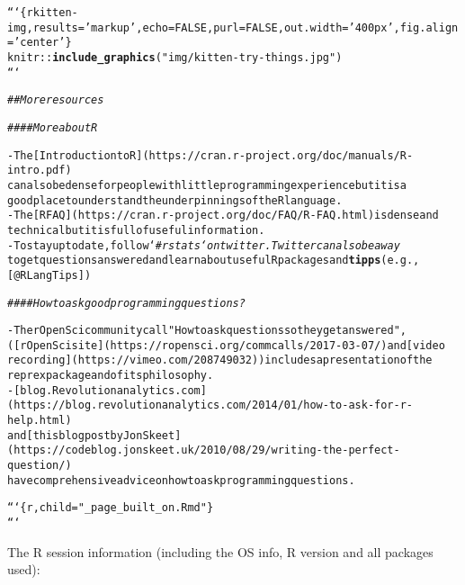 \documentclass{article}\usepackage[]{graphicx}\usepackage[]{xcolor}
\makeatletter
\newcommand{\hlstr}[1]{\textcolor[rgb]{0.192,0.494,0.8}{#1}}%
\newcommand{\hlcom}[1]{\textcolor[rgb]{0.678,0.584,0.686}{\textit{#1}}}%
\newcommand{\hlkwd}[1]{\textcolor[rgb]{0.737,0.353,0.396}{\textbf{#1}}}%
\newenvironment{kframe}{%
 \def\at@end@of@kframe{}%
 \ifinner\ifhmode%
  \def\at@end@of@kframe{\end{minipage}}%
  \begin{minipage}{\columnwidth}%
 \fi\fi%
 \def\FrameCommand##1{\hskip\@totalleftmargin \hskip-\fboxsep
 \colorbox{shadecolor}{##1}\hskip-\fboxsep
     \hskip-\linewidth \hskip-\@totalleftmargin \hskip\columnwidth}%
 \MakeFramed {\advance\hsize-\width
   \@totalleftmargin\z@ \linewidth\hsize
   \@setminipage}}%
 {\par\unskip\endMakeFramed%
 \at@end@of@kframe}
\newenvironment{knitrout}{}{} %
\makeatother
\begin{document}
\begin{knitrout}
\begin{kframe}
\begin{alltt}
```\{r kitten-img, results=\hlstr{'markup'}, echo=FALSE, purl=FALSE, out.width=\hlstr{'400px'}, fig.align=\hlstr{'center'}\}
knitr::\hlkwd{include_graphics}(\hlstr{"img/kitten-try-things.jpg"})
```

\hlcom{## More resources}

\hlcom{#### More about R}

-   The [Introduction to R](https://cran.r-project.org/doc/manuals/R-intro.pdf)
    can also be dense for people with little programming experience but it is a
    good place to understand the underpinnings of the R language.
-   The [R FAQ](https://cran.r-project.org/doc/FAQ/R-FAQ.html) is dense and
    technical but it is full of useful information.
-   To stay up to date, follow `\hlcom{#rstats` on twitter. Twitter can also be a way}
    to get questions answered and learn about useful R packages and \hlkwd{tipps} (e.g.,
    [@RLangTips])

\hlcom{#### How to ask good programming questions?}

-   The rOpenSci community call \hlstr{"How to ask questions so they get answered"},
    ([rOpenSci site](https://ropensci.org/commcalls/2017-03-07/) and [video
    recording](https://vimeo.com/208749032)) includes a presentation of the
    reprex package and of its philosophy.
-   [blog.Revolutionanalytics.com](https://blog.revolutionanalytics.com/2014/01/how-to-ask-for-r-help.html)
    and [this blog post by Jon Skeet](https://codeblog.jonskeet.uk/2010/08/29/writing-the-perfect-question/)
    have comprehensive advice on how to ask programming questions.

```\{r, child=\hlstr{"_page_built_on.Rmd"}\}
```
\end{alltt}


{\ttfamily\noindent\bfseries{}}\end{kframe}
\end{knitrout}

The R session information (including the OS info, R version and all
packages used):
\end{document}
